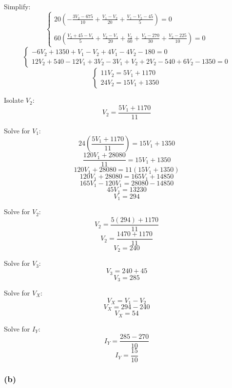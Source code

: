 \documentclass{article}
\begin{document}
				Simplify:
					\begin{equation*}\begin{cases}
						\displaystyle 20\left(-\frac{3V_2 - 675}{10} + \frac{V_1 - V_2}{20} + \frac{V_1 - V_2 - 45}{5}\right) = 0 \\ \\
						\displaystyle 60\left(\frac{V_2 + 45 - V_1}{5} + \frac{V_2 - V_1}{20} + \frac{V_2}{60} + \frac{V_2 - 270}{30} + \frac{V_2 - 225}{10}\right) = 0
					\end{cases}\end{equation*}
					\begin{equation*}\begin{cases}
						\displaystyle -6V_2 + 1350 + V_1 - V_2 + 4V_1 - 4V_2 - 180 = 0 \\
						\displaystyle 12V_2 + 540 - 12V_1 + 3V_2 - 3V_1 + V_2 + 2V_2 - 540 + 6V_2 - 1350 = 0
					\end{cases}\end{equation*}
					\begin{equation*}\begin{cases}
						\displaystyle 11V_2 = 5V_1 + 1170 \\
						\displaystyle 24V_2 = 15V_1 + 1350
					\end{cases}\end{equation*}

				Isolate $V_2$:
					\[V_2 = \frac{5V_1 + 1170}{11}\]

				Solve for $V_1$:
					\[24\left(\frac{5V_1 + 1170}{11}\right) = 15V_1 + 1350\]
					\[\frac{120V_1 + 28080}{11} = 15V_1 + 1350\]
					\[120V_1 + 28080 = 11(15V_1 + 1350)\]
					\[120V_1 + 28080 = 165V_1 + 14850\]
					\[165V_1 - 120V_1 = 28080 - 14850\]
					\[45V_1 = 13230\]
					\[V_1 = 294\]

				Solve for $V_2$:
					\[V_2 = \frac{5(294) + 1170}{11}\]
					\[V_2 = \frac{1470 + 1170}{11}\]
					\[V_2 = 240\]

				Solve for $V_3$:
					\[V_3 = 240 + 45\]
					\[V_3 = 285\]

				Solve for $V_X$:
					\[V_X = V_1 - V_2\]
					\[V_X = 294 - 240\]
					\[V_X = 54\]

				Solve for $I_Y$:
					\[I_Y = \frac{285 - 270}{10}\]
					\[I_Y = \frac{15}{10}\]

			\subsubsection*{(b)} \mbox{}
\end{document}

